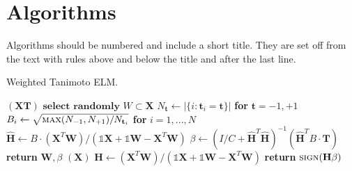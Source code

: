 
\section{Algorithms}\label{sec:algorithms}

Algorithms should be numbered and include a short title. They are set off from the text with rules above and below the title and after the last line.

\begin{algorithm}[H]
    \caption{Weighted Tanimoto ELM.}\label{alg:alg1}
    \begin{algorithmic}
        \STATE
        $(\mathbf{X} \mathbf{T})$
        \STATE \hspace{0.5cm}$ \textbf{select randomly } W \subset \mathbf{X}  $
        \STATE \hspace{0.5cm}$ N_\mathbf{t} \gets | \{ i : \mathbf{t}_i = \mathbf{t} \} | $ \textbf{ for } $ \mathbf{t}= -1,+1 $
        \STATE \hspace{0.5cm}$ B_i \gets \sqrt{ \textsc{max}(N_{-1},N_{+1}) / N_{\mathbf{t}_i} } $ \textbf{ for } $ i = 1,...,N $
        \STATE \hspace{0.5cm}$ \hat{\mathbf{H}} \gets  B \cdot (\mathbf{X}^T\textbf{W})/( \mathbb{1}\mathbf{X} + \mathbb{1}\textbf{W} - \mathbf{X}^T\textbf{W} ) $
        \STATE \hspace{0.5cm}$ \beta \gets \left ( I/C + \hat{\mathbf{H}}^T\hat{\mathbf{H}} \right )^{-1}(\hat{\mathbf{H}}^T B\cdot \mathbf{T})  $
        \STATE \hspace{0.5cm}\textbf{return}  $\textbf{W},  \beta $
        \STATE
        $(\mathbf{X} )$
        \STATE \hspace{0.5cm}$ \mathbf{H} \gets  (\mathbf{X}^T\textbf{W} )/( \mathbb{1}\mathbf{X}  + \mathbb{1}\textbf{W}- \mathbf{X}^T\textbf{W}  ) $
        \STATE \hspace{0.5cm}\textbf{return}  $\textsc{sign}( \mathbf{H} \beta )$
    \end{algorithmic}
\end{algorithm}